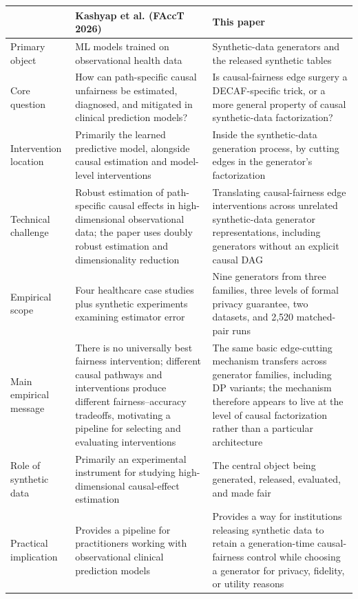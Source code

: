 \documentclass[11pt]{article}
\begin{document}
\begin{center}
\small
\begin{tabular}{p{}p{}p{}}
\toprule
 & \textbf{Kashyap et al. (FAccT 2026)} & \textbf{This paper} \\
\midrule
Primary object &
ML models trained on observational health data &
Synthetic-data generators and the released synthetic tables \\[3pt]

Core question &
How can path-specific causal unfairness be estimated, diagnosed, and mitigated in clinical prediction models? &
Is causal-fairness edge surgery a DECAF-specific trick, or a more general property of causal synthetic-data factorization? \\[3pt]

Intervention location &
Primarily the learned predictive model, alongside causal estimation and model-level interventions &
Inside the synthetic-data generation process, by cutting edges in the generator's factorization \\[3pt]

Technical challenge &
Robust estimation of path-specific causal effects in high-dimensional observational data; the paper uses doubly robust estimation and dimensionality reduction &
Translating causal-fairness edge interventions across unrelated synthetic-data generator representations, including generators without an explicit causal DAG \\[3pt]

Empirical scope &
Four healthcare case studies plus synthetic experiments examining estimator error &
Nine generators from three families, three levels of formal privacy guarantee, two datasets, and 2,520 matched-pair runs \\[3pt]

Main empirical message &
There is no universally best fairness intervention; different causal pathways and interventions produce different fairness--accuracy tradeoffs, motivating a pipeline for selecting and evaluating interventions &
The same basic edge-cutting mechanism transfers across generator families, including DP variants; the mechanism therefore appears to live at the level of causal factorization rather than a particular architecture \\[3pt]

Role of synthetic data &
Primarily an experimental instrument for studying high-dimensional causal-effect estimation &
The central object being generated, released, evaluated, and made fair \\[3pt]

Practical implication &
Provides a pipeline for practitioners working with observational clinical prediction models &
Provides a way for institutions releasing synthetic data to retain a generation-time causal-fairness control while choosing a generator for privacy, fidelity, or utility reasons \\
\bottomrule
\end{tabular}
\end{center}
\end{document}
